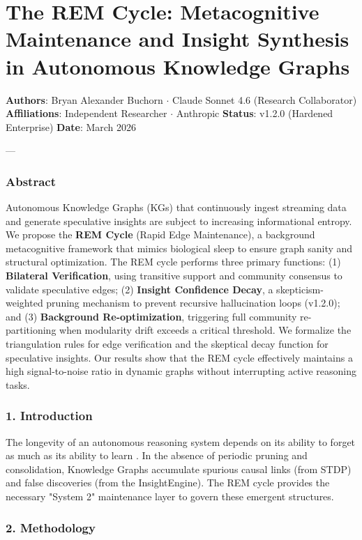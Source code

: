 \section{The REM Cycle: Metaco\-gnitive Maintenance and Insight Synthesis in Autonomous Knowledge Graphs}

\textbf{Authors}: Bryan Alexander Buchorn $\cdot$ Claude Sonnet 4.6 (Research Collab\-orator)  
\textbf{Affili\-ations}: Independent Researcher $\cdot$ Anthropic  
\textbf{Status}: v1.2.0 (Hardened Enterprise)  
\textbf{Date}: March 2026

---

\subsubsection{Abstract}
Autonomous Knowledge Graphs (KGs) that conti\-nuously ingest streaming data and generate speculative insights are subject to increasing infor\-mational entropy. We propose the \textbf{REM Cycle} (Rapid Edge Maintenance), a background metac\-ognitive framework that mimics biological sleep to ensure graph sanity and structural optim\-ization. The REM cycle performs three primary functions: (1) \textbf{Bilateral Verifi\-cation}, using transitive support and community consensus to validate speculative edges; (2) \textbf{Insight Confidence Decay}, a skepticism-weighted pruning mechanism to prevent recursive hallu\-cination loops (v1.2.0); and (3) \textbf{Background Re-optim\-ization}, triggering full community re-parti\-tioning when modularity drift exceeds a critical threshold. We formalize the trian\-gulation rules for edge verif\-ication and the skeptical decay function for speculative insights. Our results show that the REM cycle effectively maintains a high signal-to-noise ratio in dynamic graphs without inter\-rupting active reasoning tasks.

\subsubsection{1. Introd\-uction}
The longevity of an autonomous reasoning system depends on its ability to forget as much as its ability to learn \cite{diekelmann2010memory}. In the absence of periodic pruning and conso\-lidation, Knowledge Graphs accumulate spurious causal links (from STDP) and false discoveries (from the InsightEngine). The REM cycle provides the necessary "System 2" maintenance layer to govern these emergent structures.

\subsubsection{2. Methodology}

